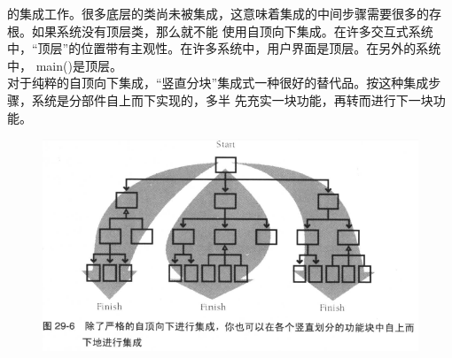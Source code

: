 \documentclass{article}
\begin{document}
的集成工作。很多底层的类尚未被集成，这意味着集成的中间步骤需要很多的存根。如果系统没有顶层类，那么就不能
使用自顶向下集成。在许多交互式系统中，“顶层”的位置带有主观性。在许多系统中，用户界面是顶层。在另外的系统中，
main()是顶层。\\
对于纯粹的自顶向下集成，“竖直分块”集成式一种很好的替代品。按这种集成步骤，系统是分部件自上而下实现的，多半
先充实一块功能，再转而进行下一块功能。
\begin{figure}[htb]
    \centering
    \includegraphics[width=15cm]{figure25.png}
\end{figure}
\end{document}
